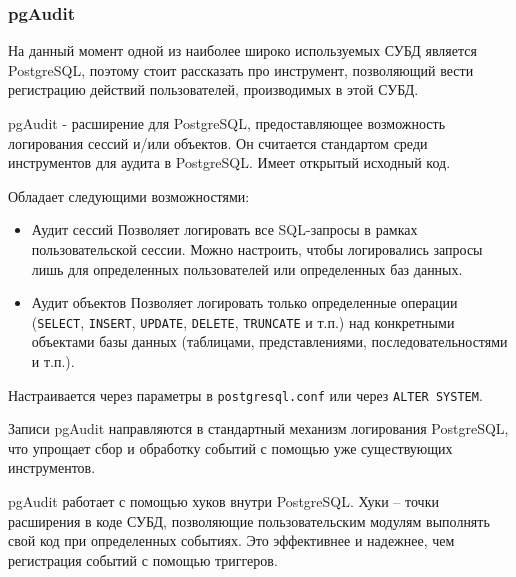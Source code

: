 \subsubsection{pgAudit}

На данный момент одной из наиболее широко используемых СУБД является PostgreSQL,
поэтому стоит рассказать про инструмент, позволяющий вести регистрацию действий пользователей,
производимых в этой СУБД.

pgAudit - расширение для PostgreSQL, предоставляющее возможность логирования сессий и/или объектов.
Он считается стандартом среди инструментов для аудита в PostgreSQL. Имеет открытый исходный код. \cite{pgAudit-github}

Обладает следующими возможностями:

\begin{itemize}
    \item Аудит сессий
    Позволяет логировать все SQL-запросы в рамках пользовательской сессии.
    Можно настроить, чтобы логировались запросы лишь для определенных пользователей или определенных баз данных.
    \item Аудит объектов
    Позволяет логировать только определенные операции (\texttt{SELECT}, \texttt{INSERT}, \texttt{UPDATE}, \texttt{DELETE}, \texttt{TRUNCATE} и т.п.)
    над конкретными объектами базы данных (таблицами, представлениями, последовательностями и т.п.).
\end{itemize}

Настраивается через параметры в \texttt{postgresql.conf} или через \texttt{ALTER SYSTEM}.

Записи pgAudit направляются в стандартный механизм логирования PostgreSQL,
что упрощает сбор и обработку событий с помощью уже существующих инструментов.

pgAudit работает с помощью хуков внутри PostgreSQL. Хуки -- точки расширения в коде СУБД, позволяющие пользовательским
модулям выполнять свой код при определенных событиях. Это эффективнее и надежнее, чем регистрация событий с помощью триггеров.


